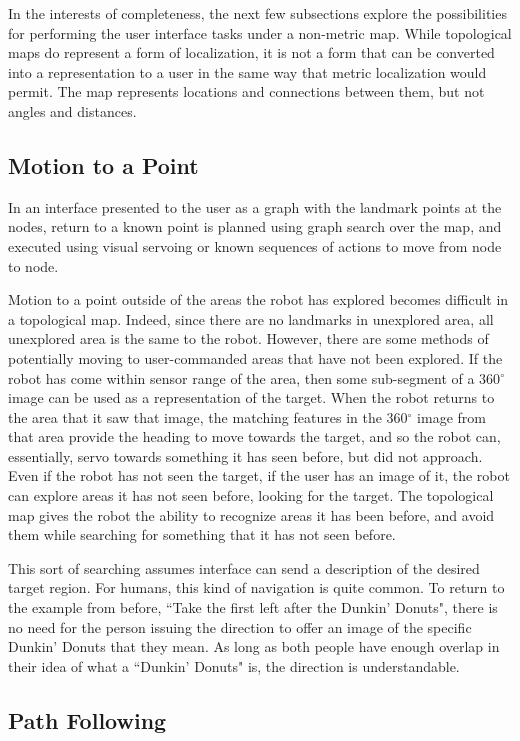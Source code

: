 In the interests of completeness, the next few subsections explore the possibilities for performing the user interface tasks under a non-metric map. 
While topological maps do represent a form of localization, it is not a form that can be converted into a representation to a user in the same way that metric localization would permit. 
The map represents locations and connections between them, but not angles and distances. 

\subsection{Motion to a Point}

In an interface presented to the user as a graph with the landmark points at the nodes, return to a known point is planned using graph search over the map, and executed using visual servoing or known sequences of actions to move from node to node. 

Motion to a point outside of the areas the robot has explored becomes difficult in a topological map. 
Indeed, since there are no landmarks in unexplored area, all unexplored area is the same to the robot. 
However, there are some methods of potentially moving to user-commanded areas that have not been explored. 
If the robot has come within sensor range of the area, then some sub-segment of a 360$^\circ$ image can be used as a representation of the target. 
When the robot returns to the area that it saw that image, the matching features in the 360$^\circ$ image from that area provide the heading to move towards the target, and so the robot can, essentially, servo towards something it has seen before, but did not approach. 
Even if the robot has not seen the target, if the user has an image of it, the robot can explore areas it has not seen before, looking for the target.
The topological map gives the robot the ability to recognize areas it has been before, and avoid them while searching for something that it has not seen before. 

This sort of searching assumes interface can send a description of the desired target region. 
For humans, this kind of navigation is quite common. 
To return to the example from before, ``Take the first left after the Dunkin' Donuts", there is no need for the person issuing the direction to offer an image of the specific Dunkin' Donuts that they mean. 
As long as both people have enough overlap in their idea of what a ``Dunkin' Donuts" is, the direction is understandable. 

\subsection{Path Following}


